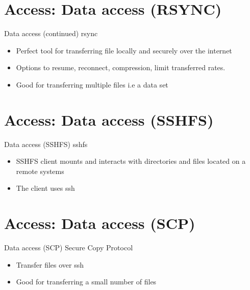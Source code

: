 {
\section{Access: Data access (RSYNC)}
%
\begin{frame}{Data access (continued)}
\text rsync
\begin{itemize}
\item Perfect tool for transferring file locally and securely over the internet
\item Options to resume, reconnect, compression, limit transferred rates.
\item Good for transferring multiple files i.e a data set
\end{itemize}
\end{frame}
}

{
\section{Access: Data access (SSHFS)}
%
\begin{frame}{Data access (SSHFS)}
\text sshfs
\begin{itemize}
\item  SSHFS client mounts and interacts with directories and files located on a remote systems
\item The client uses ssh
\end{itemize}
\end{frame}
}

{
\section{Access: Data access (SCP)}
%
\begin{frame}{Data access (SCP)}
\text Secure Copy Protocol
\begin{itemize}
\item Transfer files over ssh
\item Good for transferring a small number of files
\end{itemize}
\end{frame}
}

